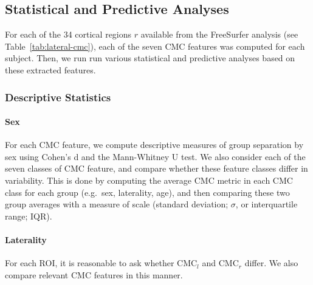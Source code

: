 \documentclass{article}
\begin{document}
%


\subsection{Statistical and Predictive Analyses}

For each of the 34 cortical regions \(r\) available from the FreeSurfer
analysis (see Table~\ref{tab:lateral-cmc}), each of the seven CMC features was
computed for each subject. Then, we run run various statistical and
predictive analyses based on these extracted features.

\subsubsection{Descriptive Statistics}



%

\paragraph{Sex} For each CMC feature, we compute descriptive measures of
group separation by sex using Cohen's d and the Mann-Whitney U test. We also
consider each of the seven classes of CMC feature, and compare whether these
feature classes differ in variability. This is done by computing the average
CMC metric in each CMC class for each group (e.g.\ sex, laterality, age), and
then comparing these two group averages with a measure of scale (standard
deviation; \(\sigma\), or interquartile range; IQR).

%

\paragraph{Laterality} For each ROI, it is reasonable to ask whether
\(\text{CMC}_l\) and \(\text{CMC}_r\) differ. We also compare relevant CMC
features in this manner.
\end{document}
